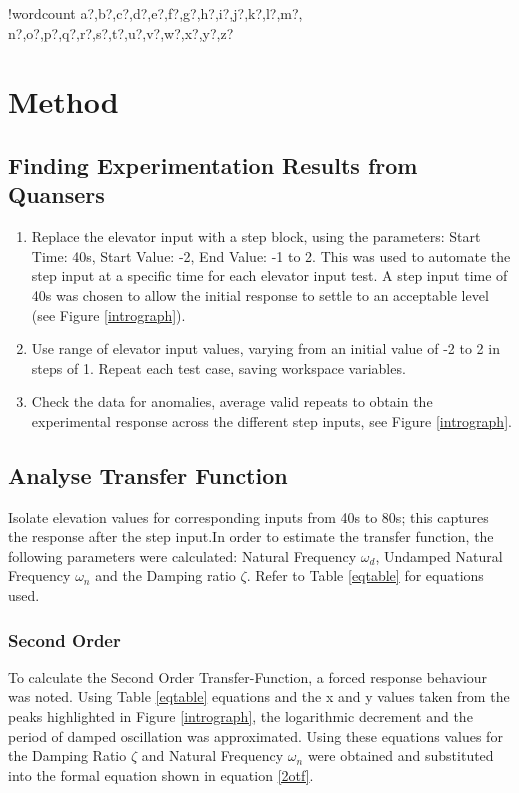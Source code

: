 \documentclass[11pt]{article}
\newcounter{words}
\newenvironment{counted}{%
  \setcounter{words}{0}
  \SearchList!{wordcount}{\stepcounter{words}}
    {a?,b?,c?,d?,e?,f?,g?,h?,i?,j?,k?,l?,m?,
    n?,o?,p?,q?,r?,s?,t?,u?,v?,w?,x?,y?,z?}
  \UndoBoundary{'}
  \SearchOrder{p;}}{%
  \StopSearching}
\begin{document}
\begin{counted}
\section{Method}\label{method}

\subsection{Finding Experimentation Results from
Quansers}\label{finding-experimentation-results-from-quansers}

\begin{enumerate}

\item
  Replace the elevator input with a step block, using the parameters:
  Start Time: 40s, Start Value: -2, End Value: -1 to 2. This was used to
  automate the step input at a specific time for each elevator input
  test. A step input time of 40s was chosen to allow the initial
  response to settle to an acceptable level (see Figure
  \ref{intrograph}).
\item
  Use range of elevator input values, varying from an initial value of
  -2 to 2 in steps of 1. Repeat each test case, saving workspace
  variables.
\item
  Check the data for anomalies, average valid repeats to obtain the
  experimental response across the different step inputs, see Figure
  \ref{intrograph}.
\end{enumerate}

\subsection{Analyse Transfer Function}\label{analyse-transfer-function}

Isolate elevation values for corresponding inputs from 40s to 80s; this
captures the response after the step input.In order to estimate the
transfer function, the following parameters were calculated: Natural
Frequency \(\omega_d\), Undamped Natural Frequency \(\omega_n\) and the
Damping ratio \(\zeta\). Refer to Table \ref{eqtable} for equations
used.

\subsubsection{Second Order}\label{second-order}

To calculate the Second Order Transfer-Function, a forced response
behaviour was noted. Using Table \ref{eqtable} equations and the x and y
values taken from the peaks highlighted in Figure \ref{intrograph}, the
logarithmic decrement and the period of damped oscillation was
approximated. Using these equations values for the Damping Ratio
\(\zeta\) and Natural Frequency \(\omega_n\) were obtained and
substituted into the formal equation shown in equation \ref{2otf}.


\end{counted}
\end{document}
